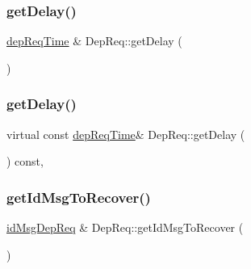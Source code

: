 \subsubsection{\texorpdfstring{get\+Delay()}{getDelay()}\hspace{0.1cm}{\footnotesize\ttfamily [1/2]}}
{\footnotesize\ttfamily \hyperlink{dep_req__m_8h_ae16a4057335e3a89fda3f6019868733b}{dep\+Req\+Time} \& Dep\+Req\+::get\+Delay (\begin{DoxyParamCaption}{ }\end{DoxyParamCaption})\hspace{0.3cm}{\ttfamily [virtual]}}

\mbox{\label{class_dep_req_a3f686e18997f1383d0670a271d45a37b}} 
\subsubsection{\texorpdfstring{get\+Delay()}{getDelay()}\hspace{0.1cm}{\footnotesize\ttfamily [2/2]}}
{\footnotesize\ttfamily virtual const \hyperlink{dep_req__m_8h_ae16a4057335e3a89fda3f6019868733b}{dep\+Req\+Time}\& Dep\+Req\+::get\+Delay (\begin{DoxyParamCaption}{ }\end{DoxyParamCaption}) const\hspace{0.3cm}{\ttfamily [inline]}, {\ttfamily [virtual]}}

\mbox{\label{class_dep_req_abbf56cc3e6a0be7ff696f9216f51f968}} 
\subsubsection{\texorpdfstring{get\+Id\+Msg\+To\+Recover()}{getIdMsgToRecover()}\hspace{0.1cm}{\footnotesize\ttfamily [1/2]}}
{\footnotesize\ttfamily \hyperlink{dep_req__m_8h_a2bbb71ed0e9660ec02d81471eafd9c29}{id\+Msg\+Dep\+Req} \& Dep\+Req\+::get\+Id\+Msg\+To\+Recover (\begin{DoxyParamCaption}{ }\end{DoxyParamCaption})\hspace{0.3cm}{\ttfamily [virtual]}}


